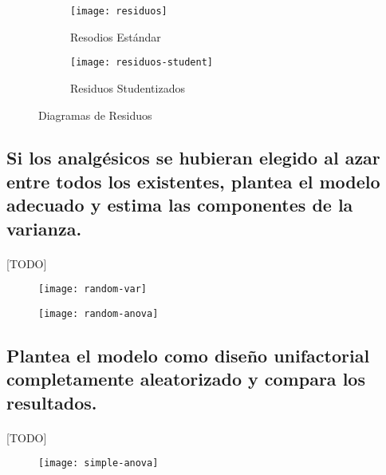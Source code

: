 \documentclass[11pt]{article}
\begin{document}
      \begin{figure}[H]
        \centering
        \begin{subfigure}{.5\textwidth}
          \centering
          \texttt{[image: residuos]}
          \caption{Resodios Estándar}
          \label{fig:sub1}
        \end{subfigure}%
        \begin{subfigure}{.5\textwidth}
          \centering
          \texttt{[image: residuos-student]}
          \caption{Residuos Studentizados}
          \label{fig:sub2}
        \end{subfigure}
        \caption{Diagramas de Residuos}
        \label{fig:test}
      \end{figure}

    \subsection{Si los analgésicos se hubieran elegido al azar entre todos los existentes, plantea el modelo adecuado y estima las componentes de la varianza.}

      \paragraph{}
      [TODO]


      \begin{figure}[H]
        \centering
        \texttt{[image: random-var]}
        \caption{}
        \label{}
      \end{figure}


      \begin{figure}[H]
        \centering
        \texttt{[image: random-anova]}
        \caption{}
        \label{}
      \end{figure}


    \subsection{Plantea el modelo como diseño unifactorial completamente aleatorizado y compara los resultados.}

      \paragraph{}
      [TODO]

      \begin{figure}[H]
        \centering
        \texttt{[image: simple-anova]}
        \caption{}
        \label{}
      \end{figure}
\end{document}
